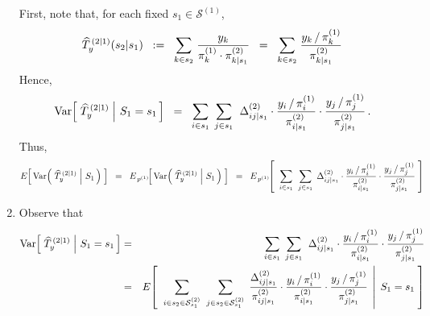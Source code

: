 \begin{enumerate}
	First, note that, for each fixed $s_{1} \in \mathcal{S}^{(1)}$,
	\begin{equation*}
	\widehat{T}^{\,(2 \vert 1)}_{y}(s_{2} \vert s_{1})
	\;\; := \;\;
		\underset{k \in s_{2}}{\sum}\;\dfrac{y_{k}}{ \pi^{(1)}_{k} \cdot \pi^{(2)}_{k \vert s_{1}} }
	\;\; = \;\;
		\underset{k \in s_{2}}{\sum}\;\dfrac{ y_{k} \,/\, \pi^{(1)}_{k} }{ \pi^{(2)}_{k \vert s_{1}} }
	\end{equation*}
	Hence,
	\begin{equation*}
	\textnormal{Var}\!\left[\, \left.\widehat{T}^{\,(2 \vert 1)}_{y} \;\right\vert\, S_{1} = s_{1} \,\right]
	\;\; = \;\;
		\underset{i \in s_{1}}{\sum}\;\,
		\underset{j \in s_{1}}{\sum}\;\;
			\Delta^{(2)}_{ij \vert s_{1}}
			\cdot
			\dfrac{ y_{i} \,/\, \pi^{(1)}_{i} }{ \pi^{(2)}_{i \vert s_{1}} }
			\cdot
			\dfrac{ y_{j} \,/\, \pi^{(1)}_{j} }{ \pi^{(2)}_{j \vert s_{1}} }\,.
	\end{equation*}
	Thus,
	\begin{equation*}
	E\!\left[\, \textnormal{Var}\!\left(\, \left.\widehat{T}^{\,(2 \vert 1)}_{y} \;\right\vert\, S_{1} \,\right) \;\right]
	\;\; = \;\;
		E_{\,p^{(1)}}\!\!\left[\, \textnormal{Var}\!\left(\, \left.\widehat{T}^{\,(2 \vert 1)}_{y} \;\right\vert\, S_{1} \,\right) \;\right]
	\;\; = \;\;
		E_{\,p^{(1)}}\!\!\left[\;\;
			\underset{i \in s_{1} }{\sum}\;\;
			\underset{j \in s_{1} }{\sum}\;\,
				\Delta^{(2)}_{ij \vert s_{1}}
				\cdot
				\dfrac{ y_{i} \,/\, \pi^{(1)}_{i} }{ \pi^{(2)}_{i \vert s_{1}} }
				\cdot
				\dfrac{ y_{j} \,/\, \pi^{(1)}_{j} }{ \pi^{(2)}_{j \vert s_{1}} }
		\;\right]
	\end{equation*}
\item
	Observe that
	\begin{eqnarray*}
	\textnormal{Var}\!\left[\, \left.\widehat{T}^{\,(2 \vert 1)}_{y} \;\right\vert\, S_{1} = s_{1} \,\right]
	& = &
		\underset{i \in s_{1}}{\sum}\;\,
		\underset{j \in s_{1}}{\sum}\;\;
			\Delta^{(2)}_{ij \vert s_{1}}
			\cdot
			\dfrac{ y_{i} \,/\, \pi^{(1)}_{i} }{ \pi^{(2)}_{i \vert s_{1}} }
			\cdot
			\dfrac{ y_{j} \,/\, \pi^{(1)}_{j} }{ \pi^{(2)}_{j \vert s_{1}} }
	\\
	& = &
		E\!\left[\;\,
		\left.
			\underset{i \in s_{2} \in \mathcal{S}^{(2)}_{s_{1}} }{\sum}\;\;
			\underset{j \in s_{2} \in \mathcal{S}^{(2)}_{s_{1}} }{\sum}\;\,
				\dfrac{ \Delta^{(2)}_{ij \vert s_{1}} }{ \pi^{(2)}_{ij \vert s_{1}} }
				\cdot
				\dfrac{ y_{i} \,/\, \pi^{(1)}_{i} }{ \pi^{(2)}_{i \vert s_{1}} }
				\cdot
				\dfrac{ y_{j} \,/\, \pi^{(1)}_{j} }{ \pi^{(2)}_{j \vert s_{1}} }
		\;\,\right\vert\;
			S_{1} = s_{1}
		\;\right]
	\end{eqnarray*}

\end{enumerate}
